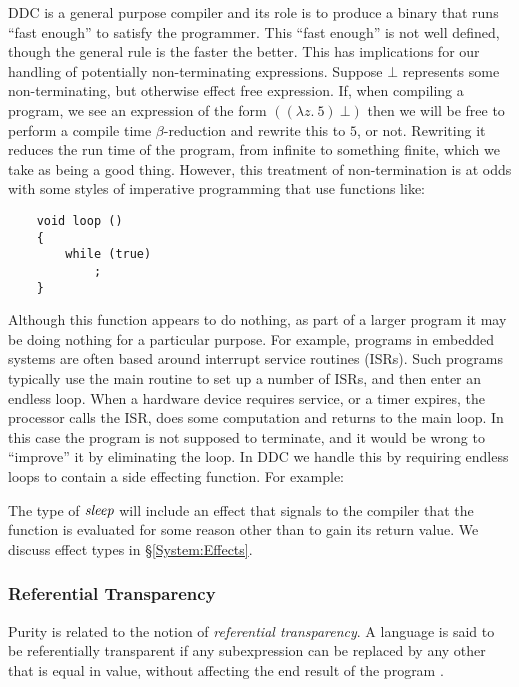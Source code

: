 DDC is a general purpose compiler and its role is to produce a binary that runs ``fast enough'' to satisfy the programmer. This ``fast enough'' is not well defined, though the general rule is the faster the better. This has implications for our handling of potentially non-terminating expressions. Suppose $\bot$ represents some non-terminating, but otherwise effect free expression. If, when compiling a program, we see an expression of the form $((\lambda z. \ 5) \ \bot)$ then we will be free to perform a compile time $\beta$-reduction and rewrite this to $5$, or not. Rewriting it reduces the run time of the program, from infinite to something finite, which we take as being a good thing. However, this treatment of non-termination is at odds with some styles of imperative programming that use functions like:

\begin{lstlisting}
    void loop ()
    {
        while (true)
            ;
    }
\end{lstlisting}

Although this function appears to do nothing, as part of a larger program it may be doing nothing for a particular purpose. For example, programs in embedded systems are often based around interrupt service routines (ISRs). Such programs typically use the main routine to set up a number of ISRs, and then enter an endless loop. When a hardware device requires service, or a timer expires, the processor calls the ISR, does some computation and returns to the main loop. In this case the program is not supposed to terminate, and it would be wrong to ``improve'' it by eliminating the loop. In DDC we handle this by requiring endless loops to contain a side effecting function. For example:


The type of $\operatorname{\mathit{sleep}}$ will include an effect that signals to the compiler that the function is evaluated for some reason other than to gain its return value. We discuss effect types in \S\ref{System:Effects}.


\subsubsection{Referential Transparency}

Purity is related to the notion of \emph{referential transparency}. A language is said to be referentially transparent if any subexpression can be replaced by any other that is equal in value, without affecting the end result of the program \cite{sondergaard:referential-transparency}. 

